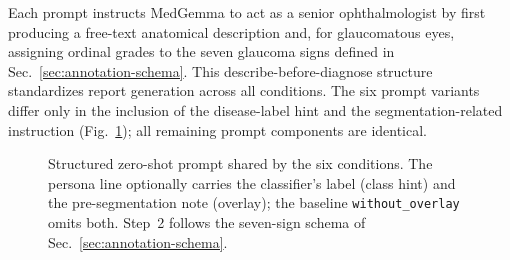 \documentclass[runningheads]{llncs}
\begin{document}
Each prompt instructs MedGemma to act as a senior ophthalmologist by first producing a free-text anatomical description and, for glaucomatous eyes, assigning ordinal grades to the seven glaucoma signs defined in Sec.~\ref{sec:annotation-schema}. This describe-before-diagnose structure standardizes report generation across all conditions. The six prompt variants differ only in the inclusion of the disease-label hint and the segmentation-related instruction (Fig.~\ref{fig:prompt}); all remaining prompt components are identical.

\begin{figure}[h]
  \centering
  \caption{Structured zero-shot prompt shared by the six conditions. The persona line optionally carries the classifier's label (class hint) and the pre-segmentation note (overlay); the baseline \texttt{without\_overlay} omits both. Step~2 follows the seven-sign schema of Sec.~\ref{sec:annotation-schema}.}
  \label{fig:prompt}
\end{figure}

\end{document}
